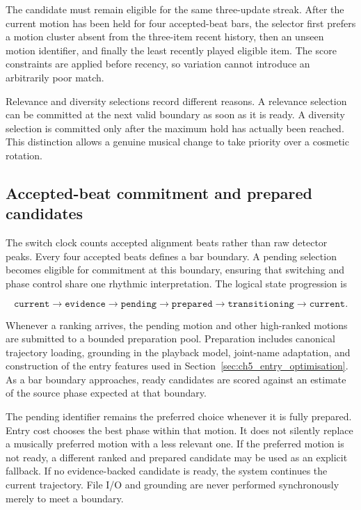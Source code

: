 The candidate must remain eligible for the same three-update streak. After the
current motion has been held for four accepted-beat bars, the selector first
prefers a motion cluster absent from the three-item recent history, then an
unseen motion identifier, and finally the least recently played eligible item.
The score constraints are applied before recency, so variation cannot introduce
an arbitrarily poor match.

Relevance and diversity selections record different reasons. A relevance
selection can be committed at the next valid boundary as soon as it is ready.
A diversity selection is committed only after the maximum hold has actually
been reached. This distinction allows a genuine musical change to take
priority over a cosmetic rotation.

\subsection{Accepted-beat commitment and prepared candidates}
\label{subsec:ch5_commitment_readiness}

The switch clock counts accepted alignment beats rather than raw detector
peaks. Every four accepted beats defines a bar boundary. A pending selection
becomes eligible for commitment at this boundary, ensuring that switching and
phase control share one rhythmic interpretation. The logical state progression
is

\begin{equation}
    \texttt{current}\rightarrow\texttt{evidence}
    \rightarrow\texttt{pending}\rightarrow\texttt{prepared}
    \rightarrow\texttt{transitioning}\rightarrow\texttt{current}.
    \label{eq:ch5_selection_states}
\end{equation}

Whenever a ranking arrives, the pending motion and other high-ranked motions
are submitted to a bounded preparation pool. Preparation includes canonical
trajectory loading, grounding in the playback model, joint-name adaptation,
and construction of the entry features used in
Section~\ref{sec:ch5_entry_optimisation}. As a bar boundary approaches, ready
candidates are scored against an estimate of the source phase expected at that
boundary.

The pending identifier remains the preferred choice whenever it is fully
prepared. Entry cost chooses the best phase within that motion. It does not
silently replace a musically preferred motion with a less relevant one. If the
preferred motion is not ready, a different ranked and prepared candidate may be
used as an explicit fallback. If no evidence-backed candidate is ready, the
system continues the current trajectory. File I/O and grounding are never
performed synchronously merely to meet a boundary.

